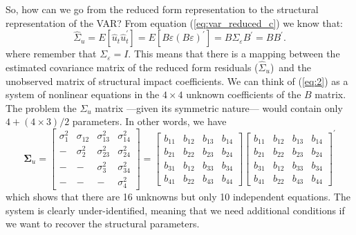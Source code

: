 \documentclass[10pt]{article}
\begin{document}
So, how can we go from the reduced form representation to the structural
representation of the VAR? From equation (\ref{eq:var_reduced_c}) we know
that:%
\begin{equation}
\hat{\Sigma}_{u}=E\left[ \hat{u}_{t}\hat{u}_{t}^{\prime }\right] =E\left[
B\varepsilon \left( B\varepsilon \right) ^{\prime }\right] =B\Sigma
_{\varepsilon }B^{\prime }=BB^{\prime }.  \label{eq:2}
\end{equation}%
where remember that $\Sigma _{\varepsilon }=I$. This means that there is a
mapping between the estimated covariance matrix of the reduced form
residuals ($\hat{\Sigma}_{u}$)\ and the unobserved matrix of structural
impact coefficients. We can think of (\ref{eq:2}) as a system of nonlinear
equations in the $4\times 4$ unknown coefficients of the $B$ matrix. The
problem the $\Sigma _{u}$ matrix ---given its symmetric nature--- would
contain only $4+(4\times 3)/2$ parameters. In other words, we have 
\begin{equation*}
\mathbf{\Sigma }_{u}=\left[ 
\begin{array}{cccc}
\sigma _{1}^{2} & \sigma _{12} & \sigma _{13}^{2} & \sigma _{14}^{2} \\ 
- & \sigma _{2}^{2} & \sigma _{23}^{2} & \sigma _{24}^{2} \\ 
- & - & \sigma _{3}^{2} & \sigma _{34}^{2} \\ 
- & - & - & \sigma _{4}^{2}%
\end{array}%
\right] =\left[ 
\begin{array}{cccc}
b_{11} & b_{12} & b_{13} & b_{14} \\ 
b_{21} & b_{22} & b_{23} & b_{24} \\ 
b_{31} & b_{12} & b_{33} & b_{34} \\ 
b_{41} & b_{22} & b_{43} & b_{44}%
\end{array}%
\right] \left[ 
\begin{array}{cccc}
b_{11} & b_{12} & b_{13} & b_{14} \\ 
b_{21} & b_{22} & b_{23} & b_{24} \\ 
b_{31} & b_{12} & b_{33} & b_{34} \\ 
b_{41} & b_{22} & b_{43} & b_{44}%
\end{array}%
\right] ^{\prime }
\end{equation*}%
which shows that there are 16 unknowns but only 10 independent equations.
The system is clearly under-identified, meaning that we need additional
conditions if we want to recover the structural parameters.
\end{document}
